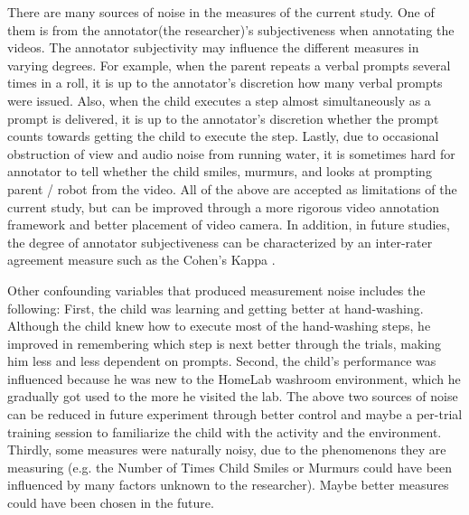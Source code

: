 There are many sources of noise in the measures of the current study.  One of them is from the annotator(the researcher)'s subjectiveness when annotating the videos.  The annotator subjectivity may influence the different measures in varying degrees.  For example, when the parent repeats a verbal prompts several times in a roll, it is up to the annotator's discretion how many verbal prompts were issued.  Also, when the child executes a step almost simultaneously as a prompt is delivered, it is up to the annotator's discretion whether the prompt counts towards getting the child to execute the step.  Lastly, due to occasional obstruction of view and audio noise from running water, it is sometimes hard for annotator to tell whether the child smiles, murmurs, and looks at prompting parent / robot from the video.  All of the above are accepted as limitations of the current study, but can be improved through a more rigorous video annotation framework and better placement of video camera.  In addition, in future studies, the degree of annotator subjectiveness can be characterized by an inter-rater agreement measure such as the Cohen's Kappa \cite{volkmar2005handbook}.

Other confounding variables that produced measurement noise includes the following: First, the child was learning and getting better at hand-washing.  Although the child knew how to execute most of the hand-washing steps, he improved in remembering which step is next better through the trials, making him less and less dependent on prompts.  Second, the child's performance was influenced because he was new to the HomeLab washroom environment, which he gradually got used to the more he visited the lab.  The above two sources of noise can be reduced in future experiment through better control and maybe a per-trial training session to familiarize the child with the activity and the environment.  Thirdly, some measures were naturally noisy, due to the phenomenons they are measuring (e.g. the Number of Times Child Smiles or Murmurs could have been influenced by many factors unknown to the researcher).  Maybe better measures could have been chosen in the future.

